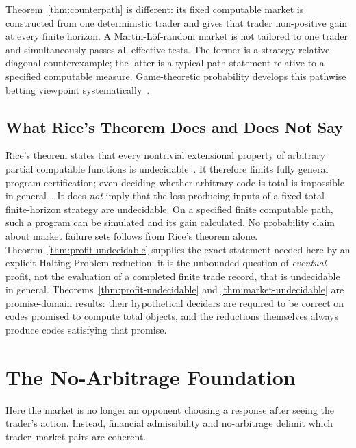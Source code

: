 \documentclass[aps,pra,reprint,superscriptaddress,amsmath,amssymb,floatfix]{revtex4-2}
\theoremstyle{plain}
\theoremstyle{definition}
\theoremstyle{remark}
\begin{document}
Theorem~\ref{thm:counterpath} is different: its fixed computable market is
constructed from one deterministic trader and gives that trader non-positive
gain at every finite horizon. A Martin-L\"of-random market is not tailored to
one trader and simultaneously passes all effective tests. The former is a
strategy-relative diagonal counterexample; the latter is a typical-path
statement relative to a specified computable measure. Game-theoretic
probability develops this pathwise betting viewpoint
systematically~\cite{ShaferVovk2001}.

\subsection{What Rice's Theorem Does and Does Not Say}

Rice's theorem states that every nontrivial extensional property of arbitrary
partial computable functions is undecidable~\cite{Rice-1953}. It therefore
limits fully general program certification; even deciding whether arbitrary
code is total is impossible in general~\cite{turing-36}. It does \emph{not}
imply that the loss-producing inputs of a fixed total finite-horizon strategy
are undecidable. On a specified finite computable path, such a program can be
simulated and its gain calculated. No probability claim about market failure
sets follows from Rice's theorem alone. Theorem~\ref{thm:profit-undecidable}
supplies the exact statement needed here by an explicit Halting-Problem
reduction: it is the unbounded question of \emph{eventual} profit, not the
evaluation of a completed finite trade record, that is undecidable in general.
Theorems~\ref{thm:profit-undecidable} and
\ref{thm:market-undecidable} are promise-domain results: their hypothetical
deciders are required to be correct on codes promised to compute total
objects, and the reductions themselves always produce codes satisfying that
promise.

\section{The No-Arbitrage Foundation}
\label{sec:noarb}

Here the market is no longer an opponent choosing a response after seeing the
trader's action. Instead, financial admissibility and no-arbitrage delimit
which trader--market pairs are coherent.
\end{document}
